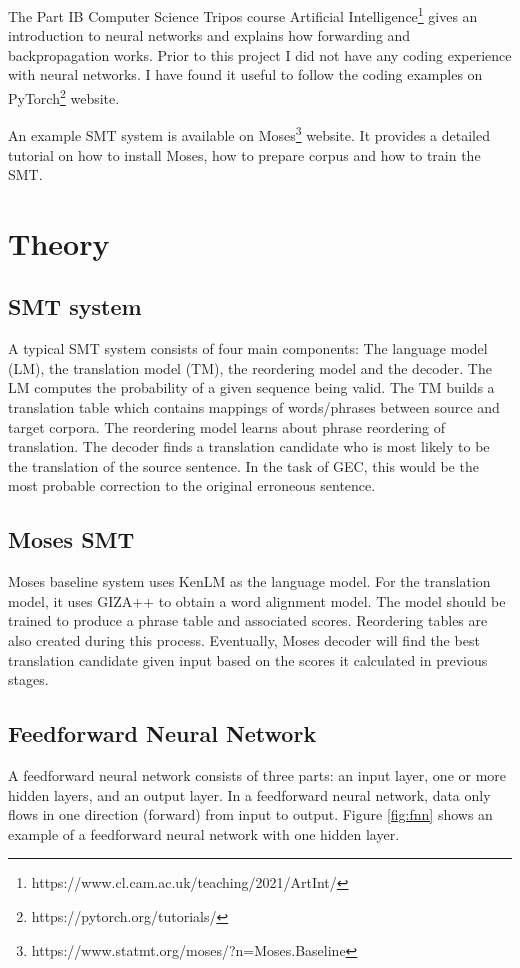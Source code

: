 \documentclass[12pt,a4paper,twoside,openright]{report}
\begin{document}
The Part IB Computer Science Tripos course Artificial Intelligence\footnote{https://www.cl.cam.ac.uk/teaching/2021/ArtInt/} gives an introduction to neural networks and explains how forwarding and backpropagation works. Prior to this project I did not have any coding experience with neural networks. I have found it useful to follow the coding examples on PyTorch\footnote{https://pytorch.org/tutorials/} website.

An example SMT system is available on Moses\footnote{https://www.statmt.org/moses/?n=Moses.Baseline} website. It provides a detailed tutorial on how to install Moses, how to prepare corpus and how to train the SMT.


\section{Theory}

\subsection{SMT system}
A typical SMT system consists of four main components: The language model (LM), the translation model (TM), the reordering model and the decoder\cite{yuan2017phd}. The LM computes the probability of a given sequence being valid. The TM builds a translation table which contains mappings of words/phrases between source and target corpora. The reordering model learns about phrase reordering of translation. The decoder finds a translation candidate who is most likely to be the translation of the source sentence. In the task of GEC, this would be the most probable correction to the original erroneous sentence.

\subsection{Moses SMT}
Moses baseline system uses KenLM as the language model. For the translation model, it uses GIZA++ to obtain a word alignment model. The model should be trained to produce a phrase table and associated scores. Reordering tables are also created during this process. Eventually, Moses decoder will find the best translation candidate given input based on the scores it calculated in previous stages.

\subsection{Feedforward Neural Network}
A feedforward neural network consists of three parts: an input layer, one or more hidden layers, and an output layer. In a feedforward neural network, data only flows in one direction (forward) from input to output. Figure \ref{fig:fnn} shows an example of a feedforward neural network with one hidden layer.
\end{document}

